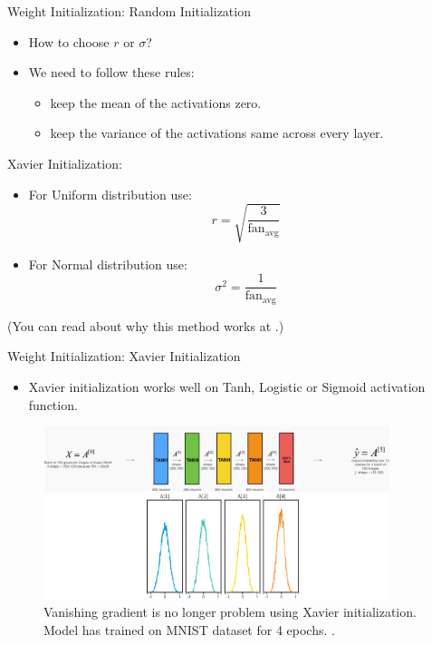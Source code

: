 \documentclass[compress,oilve,t]{beamer}
\newcommand{\tc}[2]{
	\textcolor{#1}{\hspace{-2pt}#2\hspace{-2pt}}
}
\begin{document}
\begin{frame}{Weight Initialization: Random Initialization}
	\begin{itemize}
		\item How to choose $r$ or $\sigma$?
		\item We need to follow these rules:
		\begin{itemize}
			\item keep the mean of the activations zero.
			\item keep the variance of the activations same across every layer.
		\end{itemize}
	\end{itemize}
	\begin{block}{Xavier Initialization:}
		\begin{itemize}
			\item For Uniform distribution use:
			\[
			r = \sqrt{\frac{3}{\text{fan}_\text{avg}}}
			\]
			\item For Normal distribution use:
			\[
			\sigma^2 = \frac{1}{\text{fan}_\text{avg}}
			\]
		\end{itemize}
		{\scriptsize (You can read about why this method works at \cite{katanforoosh-kunin}.)}
	\end{block}
\end{frame}

\begin{frame}{Weight Initialization: Xavier Initialization}
	\begin{itemize}
		\item Xavier initialization works well on \tc{keywords}{Tanh, Logistic or Sigmoid} activation function.
	\end{itemize}
	\begin{figure}[H]
		\centering
		\includegraphics[width=0.9\textwidth]{Figs/xavier-init.png}
		\caption{Vanishing gradient is no longer problem using Xavier initialization. Model has trained on MNIST dataset for 4 epochs. \cite{katanforoosh-kunin}.}
	\end{figure}
\end{frame}
\end{document}
